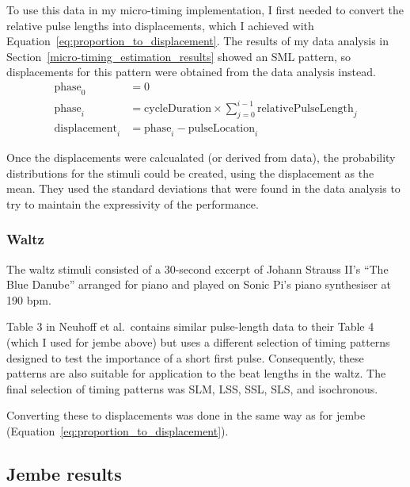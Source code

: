 \documentclass[12pt,twoside,openright]{report}
\begin{document}
To use this data in my micro-timing implementation, I first needed to convert
the relative pulse lengths into displacements, which I achieved with Equation~\ref{eq:proportion_to_displacement}. The
results of my data analysis in Section~\ref{micro-timing_estimation_results} showed an SML pattern, so displacements for this
pattern were obtained from the data analysis instead.
\begin{equation}
    \begin{split}
        \mathrm{phase}_0 &= 0 \\
        \mathrm{phase}_i &= \mathrm{cycleDuration} \times \sum_{j=0}^{i-1} \mathrm{relativePulseLength}_j \\
        \mathrm{displacement}_i &= \mathrm{phase}_i - \mathrm{pulseLocation}_i
    \end{split}
    \label{eq:proportion_to_displacement}
\end{equation}

Once the displacements were calcualated (or derived from data), the probability distributions for the stimuli could be created, using the displacement as the mean. They used the standard deviations that were found in the data analysis to try to maintain the expressivity of the performance.

\subsubsection{Waltz} \label{waltz_stimuli}

The waltz stimuli consisted of a 30-second excerpt of Johann Strauss II's ``The
Blue Danube'' arranged for piano and played on Sonic Pi's piano synthesiser at
190 bpm.

Table 3 in Neuhoff et al.\ contains similar
pulse-length data to their Table 4 (which I used for jembe above) but uses a different
selection of timing patterns designed to test the importance of a short first
pulse. Consequently, these patterns are also suitable for application to the
beat lengths in the waltz. The final selection of timing patterns was SLM, LSS,
SSL, SLS, and isochronous.

Converting these to displacements was done in the same way as for jembe (Equation~\ref{eq:proportion_to_displacement}).


\subsection{Jembe results} \label{user_study_jembe_results}
\end{document}
